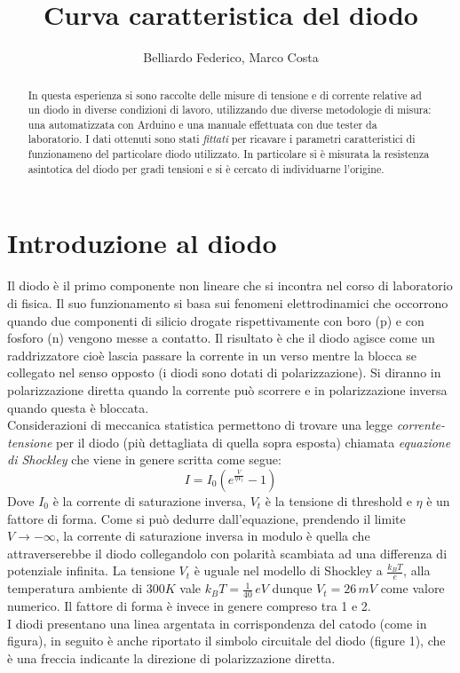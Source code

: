 \documentclass[a4paper,10pt]{article}
\title{Curva caratteristica del diodo}
\author{Belliardo Federico, Marco Costa}
\begin{document}
\maketitle

\begin{abstract}
In questa esperienza si sono raccolte delle misure di tensione e di corrente relative ad un diodo in diverse condizioni di lavoro, utilizzando due diverse metodologie di misura: 
una automatizzata con Arduino e una manuale effettuata con due tester da laboratorio. I dati ottenuti sono stati \emph{fittati} per ricavare i parametri caratteristici di funzionameno del particolare diodo utilizzato. In particolare si è misurata la resistenza asintotica del diodo per gradi tensioni e si è cercato di individuarne l'origine.
\end{abstract}

\section{Introduzione al diodo}
Il diodo è il primo componente non lineare che si incontra nel corso di laboratorio di fisica. Il suo funzionamento si basa sui fenomeni elettrodinamici che occorrono quando due 
componenti di silicio drogate rispettivamente con boro (p) e con fosforo (n) vengono messe a contatto. Il risultato è che il diodo agisce come un raddrizzatore cioè lascia passare la corrente in un verso mentre la blocca
se collegato nel senso opposto (i diodi sono dotati di polarizzazione). Si diranno in polarizzazione diretta quando la corrente può scorrere e in polarizzazione inversa quando questa è bloccata.
\\
Considerazioni di meccanica statistica permettono di trovare una legge \emph{corrente-tensione} per il diodo (più dettagliata di quella sopra esposta) chiamata \emph{equazione di Shockley} che viene
in genere scritta come segue: 
\begin{equation}
 I = I_0 (e^{\frac{V}{\eta V_t}}-1)
\end{equation}
Dove $I_0$ è la corrente di saturazione inversa, $V_t$ è la tensione di threshold e $\eta$ è un fattore di forma.
Come si può dedurre dall'equazione, prendendo il limite $V \longrightarrow -\infty$, la corrente di saturazione inversa in modulo è quella che attraverserebbe il diodo 
collegandolo con polarità scambiata ad una differenza di potenziale infinita.
La tensione $V_t$ è uguale nel modello di Shockley a $\frac{k_B T}{e}$, alla temperatura ambiente di $300 K$ vale $k_B T = \frac{1}{40}\, eV$ dunque $V_t = 26 \, mV$ come valore numerico.
Il fattore di forma è invece in genere compreso tra 1 e 2.
\\
I diodi presentano una linea argentata in corrispondenza del catodo (come in figura), in seguito è anche riportato il simbolo circuitale del diodo (figure 1), che è una freccia indicante 
la direzione di polarizzazione diretta.
\end{document}
